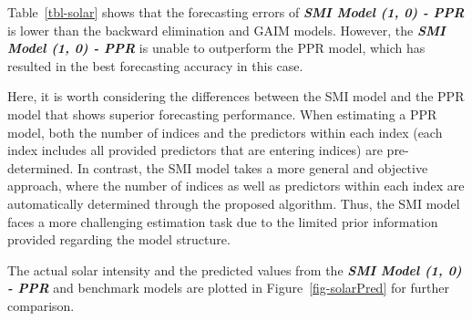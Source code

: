 \documentclass[
  11pt,
  a4paper,
]{article}
\begin{document}
\begin{table}

\caption{\label{tbl-solar}Daily solar intensity forecasting -
Out-of-sample point forecast results.}


\end{table}%

Table~\ref{tbl-solar} shows that the forecasting errors of
\textbf{\emph{SMI Model (1, 0) - PPR}} is lower than the backward
elimination and GAIM models. However, the \textbf{\emph{SMI Model (1, 0)
- PPR}} is unable to outperform the PPR model, which has resulted in the
best forecasting accuracy in this case.

Here, it is worth considering the differences between the SMI model and
the PPR model that shows superior forecasting performance. When
estimating a PPR model, both the number of indices and the predictors
within each index (each index includes all provided predictors that are
entering indices) are pre-determined. In contrast, the SMI model takes a
more general and objective approach, where the number of indices as well
as predictors within each index are automatically determined through the
proposed algorithm. Thus, the SMI model faces a more challenging
estimation task due to the limited prior information provided regarding
the model structure.

The actual solar intensity and the predicted values from the
\textbf{\emph{SMI Model (1, 0) - PPR}} and benchmark models are plotted
in Figure~\ref{fig-solarPred} for further comparison.
\end{document}
